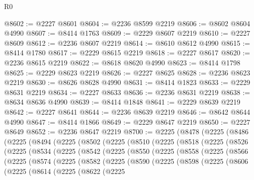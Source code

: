 \begin{lexlean}{R0}
\begin{coremodule}
@8602 := @2227 @8601
@8604 := @2236 @8599 @2219
@8606 := @8602 @8604 @4990
@8607 := @8414 @1763
@8609 := @2229 @8607 @2219
@8610 := @2227 @8609
@8612 := @2236 @8607 @2219
@8614 := @8610 @8612 @4990
@8615 := @8414 @1780
@8617 := @2229 @8615 @2219
@8618 := @2227 @8617
@8620 := @2236 @8615 @2219
@8622 := @8618 @8620 @4990
@8623 := @8414 @1798
@8625 := @2229 @8623 @2219
@8626 := @2227 @8625
@8628 := @2236 @8623 @2219
@8630 := @8626 @8628 @4990
@8631 := @8414 @1823
@8633 := @2229 @8631 @2219
@8634 := @2227 @8633
@8636 := @2236 @8631 @2219
@8638 := @8634 @8636 @4990
@8639 := @8414 @1848
@8641 := @2229 @8639 @2219
@8642 := @2227 @8641
@8644 := @2236 @8639 @2219
@8646 := @8642 @8644 @4990
@8647 := @8414 @1866
@8649 := @2229 @8647 @2219
@8650 := @2227 @8649
@8652 := @2236 @8647 @2219
@8700 := @2225
    (@8478
      (@2225
        (@8486
          (@2225
            (@8494
              (@2225
                (@8502
                  (@2225
                    (@8510
                      (@2225
                        (@8518
                          (@2225
                            (@8526
                              (@2225
                                (@8534
                                  (@2225
                                    (@8542
                                      (@2225
                                        (@8550
                                          (@2225
                                            (@8558
                                              (@2225
                                                (@8566
                                                  (@2225
                                                    (@8574
                                                      (@2225
                                                        (@8582
                                                          (@2225
                                                            (@8590
                                                              (@2225
                                                                (@8598
                                                                  (@2225
                                                                    (@8606
                                                                      (@2225
                                                                        (@8614
                                                                          (@2225
                                                                            (@8622
                                                                              (@2225

\end{coremodule}
\end{lexlean}
